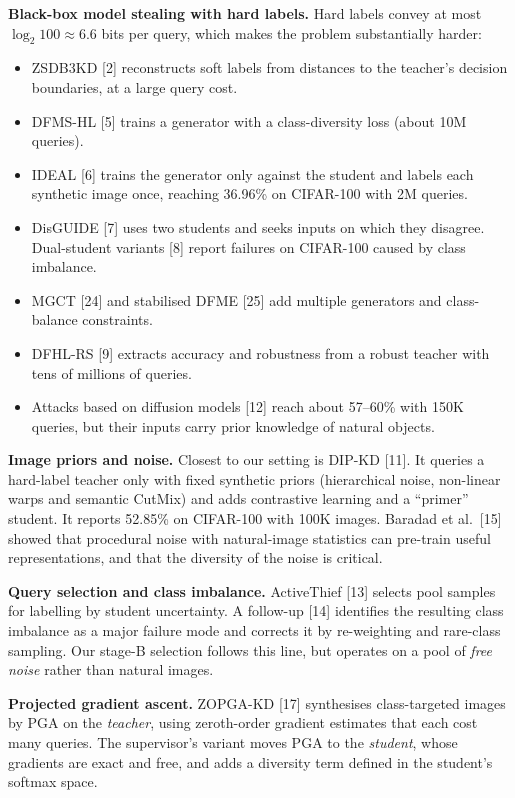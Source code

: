 \documentclass[
  10pt,
]{article}
\providecommand{\tightlist}{%
  \setlength{\itemsep}{0pt}\setlength{\parskip}{0pt}}
\begin{document}
\textbf{Black-box model stealing with hard labels.} Hard labels convey
at most \(\log_2 100 \approx 6.6\) bits per query, which makes the
problem substantially harder:

\begin{itemize}
\tightlist
\item
  ZSDB3KD {[}2{]} reconstructs soft labels from distances to the
  teacher's decision boundaries, at a large query cost.
\item
  DFMS-HL {[}5{]} trains a generator with a class-diversity loss (about
  10M queries).
\item
  IDEAL {[}6{]} trains the generator only against the student and labels
  each synthetic image once, reaching 36.96\% on CIFAR-100 with 2M
  queries.
\item
  DisGUIDE {[}7{]} uses two students and seeks inputs on which they
  disagree. Dual-student variants {[}8{]} report failures on CIFAR-100
  caused by class imbalance.
\item
  MGCT {[}24{]} and stabilised DFME {[}25{]} add multiple generators and
  class-balance constraints.
\item
  DFHL-RS {[}9{]} extracts accuracy and robustness from a robust teacher
  with tens of millions of queries.
\item
  Attacks based on diffusion models {[}12{]} reach about 57--60\% with
  150K queries, but their inputs carry prior knowledge of natural
  objects.
\end{itemize}

\textbf{Image priors and noise.} Closest to our setting is DIP-KD
{[}11{]}. It queries a hard-label teacher only with fixed synthetic
priors (hierarchical noise, non-linear warps and semantic CutMix) and
adds contrastive learning and a ``primer'' student. It reports 52.85\%
on CIFAR-100 with 100K images. Baradad et al.~{[}15{]} showed that
procedural noise with natural-image statistics can pre-train useful
representations, and that the diversity of the noise is critical.

\textbf{Query selection and class imbalance.} ActiveThief {[}13{]}
selects pool samples for labelling by student uncertainty. A follow-up
{[}14{]} identifies the resulting class imbalance as a major failure
mode and corrects it by re-weighting and rare-class sampling. Our
stage-B selection follows this line, but operates on a pool of
\emph{free noise} rather than natural images.

\textbf{Projected gradient ascent.} ZOPGA-KD {[}17{]} synthesises
class-targeted images by PGA on the \emph{teacher}, using zeroth-order
gradient estimates that each cost many queries. The supervisor's variant
moves PGA to the \emph{student}, whose gradients are exact and free, and
adds a diversity term defined in the student's softmax space.
\end{document}
